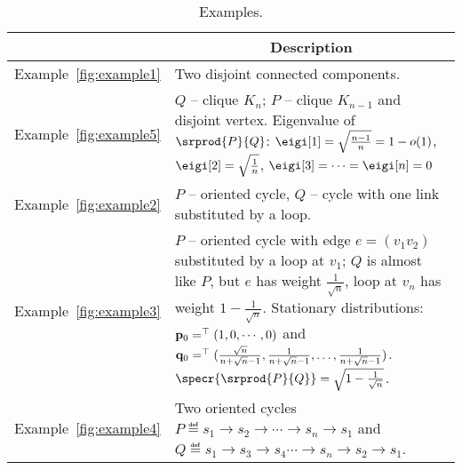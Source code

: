 	
	\vspace{5ex}
	\begin{table}
	\begin{tabular}{ | l | p{} |}
		\cline{2-2}
		
		\multicolumn{1}{c|}{} &  \multicolumn{1}{c|}{Description} \\ \hline
		Example~\ref*{fig:example1} & Two disjoint connected components. \\ \hline
		Example~\ref*{fig:example5} & $Q$ -- clique $K_n$; $P$ -- clique $K_{n-1}$ and disjoint vertex.
		Eigenvalue of $\srprod{P}{Q}$: $\eigi[1]=\sqrt{\frac{n-1}{n}}=1-o(1)$, 
		$\eigi[2]=\sqrt{\frac{1}{n}}$, $\eigi[3]=\cdots=\eigi[n]=0$	\\  \hline												
		Example~\ref*{fig:example2} & $P$ -- oriented cycle, $Q$ -- cycle with one link substituted by a loop.\\ \hline
		Example~\ref*{fig:example3} & $P$ -- oriented cycle with edge $e=(v_1v_2)$ substituted by a loop at $v_1$; 
		$Q$ is almost like $P$, but $e$ has weight $\frac{1}{\sqrt{n}}$, loop at $v_n$ has weight $1-\frac{1}{\sqrt{n}}$. 
		Stationary distributions: $\mathbf{p}_0=^{\top}{(1,0,\cdots,0)}$ 
		and $\mathbf{q}_0=^{\top}{(\frac{\sqrt{n}}{n+\sqrt{n}-1},\frac{1}{n+\sqrt{n}-1},\dots,\frac{1}{n+\sqrt{n}-1})}$. 
		$\specr{\srprod{P}{Q}}=\sqrt{1-\frac{1}{\sqrt{n}}}$.   \\  \hline
		Example~\ref*{fig:example4} & Two oriented cycles $P\eqdef s_1\to s_2\to\cdots\to s_n\to s_1$ and 
		$Q\eqdef s_1\to s_3\to s_4\cdots\to s_n\to s_2\to s_1$.	\\  \hline											
	\end{tabular}
	\caption{Examples.} \label{fig:examples}
	\end{table}


